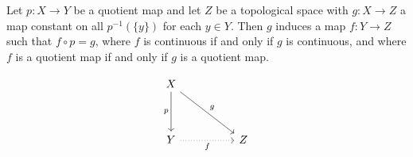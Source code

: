 \begin{theorem}\label{2.4.7}
    Let $p:X \rightarrow Y$ be a quotient map and let  $Z$ be a topological
    space with  $g:X \rightarrow Z$ a map constant on all  $p^{-1}(\{y\})$ for
    each $y \in Y$. Then  $g$ induces a map $f:Y \rightarrow Z$ such that
    $f \circ p=g$, where  $f$ is continuous if and only if  $g$ is continuous,
    and where  $f$ is a quotient map if and only if  $g$ is a quotient map.

    \[\begin{tikzcd}
        X \\
        \\
        Y && Z
        \arrow["g", from=1-1, to=3-3]
        \arrow["f"', dotted, from=3-1, to=3-3]
        \arrow["p"', from=1-1, to=3-1]
    \end{tikzcd}\]
\end{theorem}

